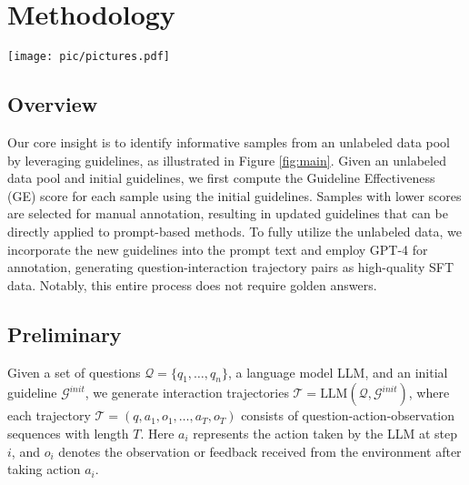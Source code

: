 \section{Methodology}

\begin{figure*}[ht]
    \centering
    \texttt{[image: pic/pictures.pdf]}
    \caption{The overall process of our method and an example of how guidelines correct LLM's behavior}
    \label{fig:main}
\end{figure*}

\subsection{Overview}

Our core insight is to identify informative samples from an unlabeled data pool by leveraging guidelines, as illustrated in Figure \ref{fig:main}.
Given an unlabeled data pool and initial guidelines, we first compute the Guideline Effectiveness (GE) score for each sample using the initial guidelines. Samples with lower scores are selected for manual annotation, resulting in updated guidelines that can be directly applied to prompt-based methods.
To fully utilize the unlabeled data, we incorporate the new guidelines into the prompt text and employ GPT-4 for annotation, generating question-interaction trajectory pairs as high-quality SFT data. Notably, this entire process does not require golden answers.

\subsection{Preliminary}

Given a set of questions $\mathcal{Q}=\{q_1,\dots,q_n\}$, a language model LLM, and an initial guideline $\mathcal{G}^{init}$, we generate interaction trajectories $\mathcal{T}=\text{LLM}(\mathcal{Q}, \mathcal{G}^{init})$, where each trajectory $\mathcal{T}=(q, a_1, o_1, \ldots, a_T,o_T)$ consists of question-action-observation sequences with length $T$. Here $a_i$ represents the action taken by the LLM at step $i$, and $o_i$ denotes the observation or feedback received from the environment after taking action $a_i$.

